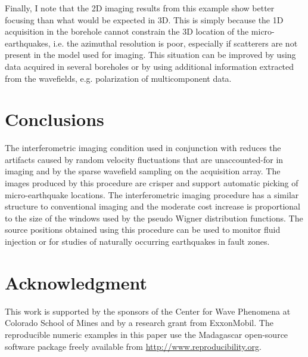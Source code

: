 
Finally, I note that the 2D imaging results from this example show
better focusing than what would be expected in 3D. This is simply
because the 1D acquisition in the borehole cannot constrain the 3D
location of the micro-earthquakes, i.e. the azimuthal resolution is
poor, especially if scatterers are not present in the model used for
imaging. This situation can be improved by using data acquired in
several boreholes or by using additional information extracted from
the wavefields, e.g. polarization of multicomponent data.

\section{Conclusions}

The interferometric imaging condition used in conjunction with
  reduces the
artifacts caused by random velocity fluctuations that are
unaccounted-for in imaging and by the sparse wavefield sampling on the
acquisition array. The images produced by this procedure are crisper
and support automatic picking of micro-earthquake
locations.  The
interferometric imaging procedure has a similar structure to
conventional imaging and the moderate cost increase is proportional to
the size of the windows used by the pseudo Wigner distribution
functions. The source positions obtained using this procedure can be
used to monitor fluid injection or for studies of naturally occurring
earthquakes in fault zones.

\section{Acknowledgment}
This work is supported by the sponsors of the Center for Wave
Phenomena at Colorado School of Mines and by a research grant from
ExxonMobil.
%
The reproducible numeric examples in this paper use the Madagascar
open-source software package freely available from
\url{http://www.reproducibility.org}.





